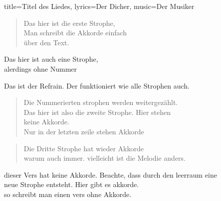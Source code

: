 \begin{song}{title={Titel des Liedes}, lyrics={Der Dicher}, music={Der Musiker}}
	\begin{verse}
		Das hier ist die erste Strophe,\\
		Man schreibt die Akkorde einfach\\
		über den Text. \\
	\end{verse}
	\begin{verse*}
		Das hier ist auch eine Strophe,\\
		alerdings ohne Nummer\\
	\end{verse*}
	\begin{refrain}
		Das ist der Refrain. Der funktioniert wie alle Strophen auch.\\
	\end{refrain}
	\begin{verse}
		Die Nummerierten strophen werden weitergezählt.\\
		Das hier ist also die zweite Strophe. Hier stehen\\
		keine Akkorde.\\
		Nur in der letzten zeile stehen Akkorde\\
	\end{verse}
	\begin{verse}
		Die Dritte Strophe hat wieder Akkorde           \chord{e}  \\
		warum auch immer. vielleicht ist die Melodie anders.\\
	\end{verse}
	\begin{verse*}
		dieser Vers hat keine Akkorde. Beachte, dass durch den leerraum eine \\
		neue Strophe entsteht. Hier gibt es akkorde.\\
		so schreibt man einen vers ohne Akkorde. \\
	\end{verse*}
\end{song}